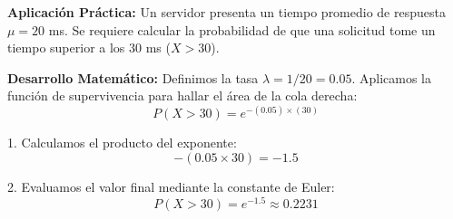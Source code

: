 \documentclass[12pt,a4paper]{article}
\begin{document}
\vspace{0.4cm}
\textbf{Aplicación Práctica:} 
Un servidor presenta un tiempo promedio de respuesta $\mu = 20$ ms. Se requiere calcular la probabilidad de que una solicitud tome un tiempo superior a los 30 ms ($X > 30$).

\vspace{0.4cm}
\textbf{Desarrollo Matemático:}
Definimos la tasa $\lambda = 1/20 = 0.05$. Aplicamos la función de supervivencia para hallar el área de la cola derecha:
\[ P(X > 30) = e^{-(0.05) \times (30)} \]

1. Calculamos el producto del exponente:
\[ -(0.05 \times 30) = -1.5 \]

2. Evaluamos el valor final mediante la constante de Euler:
\[ P(X > 30) = e^{-1.5} \approx \mathbf{0.2231} \]
\end{document}
